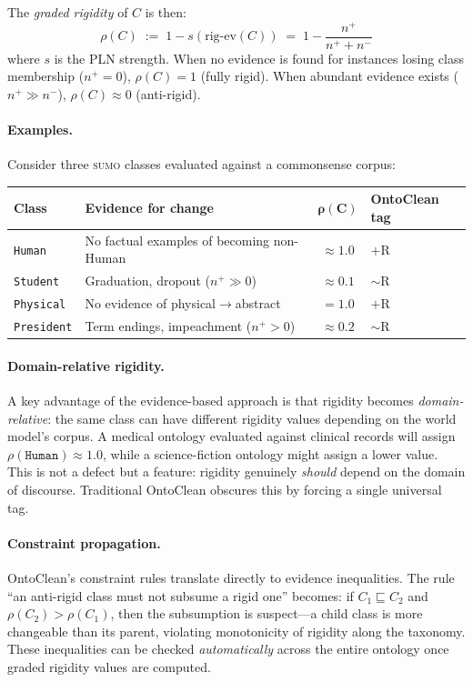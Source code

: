 \documentclass[11pt]{article}
\newcommand{\SUMO}{\textsc{sumo}}
\theoremstyle{definition}
\theoremstyle{plain}
\begin{document}
The \emph{graded rigidity} of $C$ is then:
\[
  \rho(C) \;:=\; 1 - s(\mathrm{rig\text{-}ev}(C))
  \;=\; 1 - \frac{n^+}{n^+ + n^-}
\]
where $s$ is the PLN strength.  When no evidence is found for
instances losing class membership ($n^+ = 0$), $\rho(C) = 1$
(fully rigid).  When abundant evidence exists ($n^+ \gg n^-$),
$\rho(C) \approx 0$ (anti-rigid).

\paragraph{Examples.}
Consider three \SUMO{} classes evaluated against a commonsense
corpus:

\begin{center}
\small
\begin{tabular}{@{}llcl@{}}
\toprule
\textbf{Class} & \textbf{Evidence for change} &
  $\boldsymbol{\rho(C)}$ & \textbf{OntoClean tag} \\
\midrule
\texttt{Human} & No factual examples of becoming non-Human
  & $\approx 1.0$ & $+$R \\
\texttt{Student} & Graduation, dropout ($n^+ \gg 0$)
  & $\approx 0.1$ & ${\sim}$R \\
\texttt{Physical} & No evidence of physical$\to$abstract
  & $= 1.0$ & $+$R \\
\texttt{President} & Term endings, impeachment ($n^+ > 0$)
  & $\approx 0.2$ & ${\sim}$R \\
\bottomrule
\end{tabular}
\end{center}

\paragraph{Domain-relative rigidity.}
A key advantage of the evidence-based approach is that rigidity
becomes \emph{domain-relative}: the same class can have different
rigidity values depending on the world model's corpus.  A medical
ontology evaluated against clinical records will assign $\rho(\texttt{Human})
\approx 1.0$, while a science-fiction ontology might assign a lower
value.  This is not a defect but a feature: rigidity genuinely
\emph{should} depend on the domain of discourse.  Traditional
OntoClean obscures this by forcing a single universal tag.

\paragraph{Constraint propagation.}
OntoClean's constraint rules translate directly to evidence
inequalities.  The rule ``an anti-rigid class must not subsume a
rigid one'' becomes: if $C_1 \sqsubseteq C_2$ and
$\rho(C_2) > \rho(C_1)$, then the subsumption is suspect---a child
class is more changeable than its parent, violating monotonicity of
rigidity along the taxonomy.  These inequalities can be checked
\emph{automatically} across the entire ontology once graded rigidity
values are computed.
\end{document}
